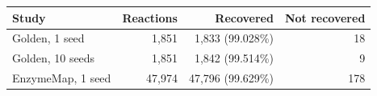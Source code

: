 \begin{tabular}{lrrr}\toprule
Study & Reactions & Recovered & Not recovered\\\midrule
Golden, 1 seed & 1,851 & 1,833 (99.028\%) & 18\\
Golden, 10 seeds & 1,851 & 1,842 (99.514\%) & 9\\
EnzymeMap, 1 seed & 47,974 & 47,796 (99.629\%) & 178\\
\bottomrule\end{tabular}
